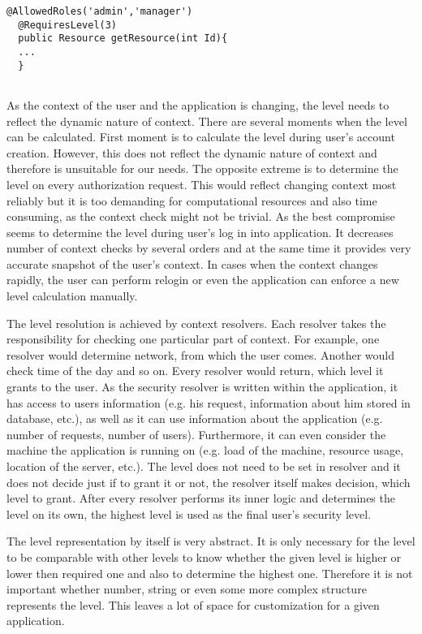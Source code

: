 \documentclass{sig-alternate}
\begin{document}
 
\begin{lstlisting}[]
  @AllowedRoles('admin','manager')
  @RequiresLevel(3)
  public Resource getResource(int Id){
  ...
  }
                
\end{lstlisting}

As the context of the user and the application is changing, the level needs to reflect the dynamic nature of context. There are several moments when the level can be calculated. First moment is to calculate the level during user's account creation. However, this does not reflect the dynamic nature of context and therefore is unsuitable for our needs. The opposite extreme is to determine the level on every authorization request. This would reflect changing context most reliably but it is too demanding for computational resources and also time consuming, as the context check might not be trivial. As the best compromise seems to determine the level during user's log in into application. It decreases number of context checks by several orders and at the same time it provides very accurate snapshot of the user's context. In cases when the context changes rapidly, the user can perform relogin or even the application can enforce a new level calculation manually.

The level resolution is achieved by context resolvers. Each resolver takes the responsibility for checking one particular part of context. For example, one resolver would determine network, from which the user comes. Another would check time of the day and so on. Every resolver would return, which level it grants to the user. As the security resolver is written within the application, it has access to users information (e.g. his request, information about him stored in database, etc.), as well as it can use information about the application (e.g. number of requests, number of users). Furthermore, it can even consider the machine the application is running on (e.g. load of the machine, resource usage, location of the server, etc.). The level does not need to be set in resolver and it does not decide just if to grant it or not, the resolver itself makes decision, which level to grant. After every resolver performs its inner logic and determines the level on its own, the highest level is used as the final user's security level.

The level representation by itself is very abstract. It is only necessary for the level to be comparable with other levels to know whether the given level is higher or lower then required one and also to determine the highest one. Therefore it is not important whether number, string or even some more complex structure represents the level. This leaves a lot of space for customization for a given application.
\end{document}
